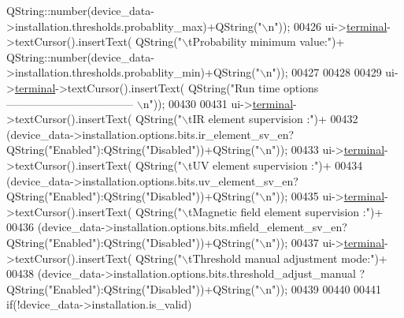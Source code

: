 \begin{DoxyCode}
      QString::number(device\_data->installation.thresholds.probablity\_max)+QString(\textcolor{stringliteral}{"\(\backslash\)n"}));
00426        ui->\hyperlink{a00080_aae71c46ea4546df5994735dee573b2dd}{terminal}->textCursor().insertText( QString(\textcolor{stringliteral}{"\(\backslash\)tProbability minimum value:"})+
      QString::number(device\_data->installation.thresholds.probablity\_min)+QString(\textcolor{stringliteral}{"\(\backslash\)n"}));
00427 
00428 
00429        ui->\hyperlink{a00080_aae71c46ea4546df5994735dee573b2dd}{terminal}->textCursor().insertText( QString(\textcolor{stringliteral}{"Run time options 
       ----------------------------------- \(\backslash\)n"}));
00430 
00431        ui->\hyperlink{a00080_aae71c46ea4546df5994735dee573b2dd}{terminal}->textCursor().insertText( QString(\textcolor{stringliteral}{"\(\backslash\)tIR element supervision :"})+
00432                                             (device\_data->installation.options.bits.ir\_element\_sv\_en?
      QString(\textcolor{stringliteral}{"Enabled"}):QString(\textcolor{stringliteral}{"Disabled"}))+QString(\textcolor{stringliteral}{"\(\backslash\)n"}));
00433        ui->\hyperlink{a00080_aae71c46ea4546df5994735dee573b2dd}{terminal}->textCursor().insertText( QString(\textcolor{stringliteral}{"\(\backslash\)tUV element supervision :"})+
00434                                             (device\_data->installation.options.bits.uv\_element\_sv\_en?
      QString(\textcolor{stringliteral}{"Enabled"}):QString(\textcolor{stringliteral}{"Disabled"}))+QString(\textcolor{stringliteral}{"\(\backslash\)n"}));
00435        ui->\hyperlink{a00080_aae71c46ea4546df5994735dee573b2dd}{terminal}->textCursor().insertText( QString(\textcolor{stringliteral}{"\(\backslash\)tMagnetic field element supervision :"})+
00436                                             (device\_data->installation.options.bits.mfield\_element\_sv\_en?
      QString(\textcolor{stringliteral}{"Enabled"}):QString(\textcolor{stringliteral}{"Disabled"}))+QString(\textcolor{stringliteral}{"\(\backslash\)n"}));
00437        ui->\hyperlink{a00080_aae71c46ea4546df5994735dee573b2dd}{terminal}->textCursor().insertText( QString(\textcolor{stringliteral}{"\(\backslash\)tThreshold manual adjustment mode:"})+
00438                                             (device\_data->installation.options.bits.threshold\_adjust\_manual
      ?QString(\textcolor{stringliteral}{"Enabled"}):QString(\textcolor{stringliteral}{"Disabled"}))+QString(\textcolor{stringliteral}{"\(\backslash\)n"}));
00439 
00440 
00441        \textcolor{keywordflow}{if}(!device\_data->installation.is\_valid)

\end{DoxyCode}
